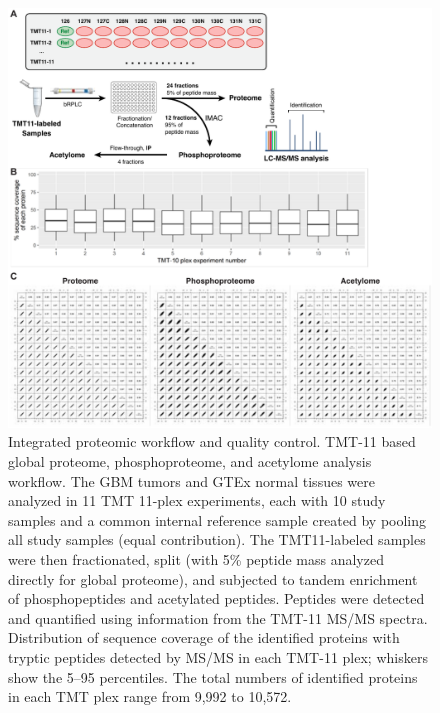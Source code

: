 \begin{figure}[p]
    \centering
    \includegraphics[width=0.9\linewidth]{figures/chap04_cptac_gbm_discov/figures1_proteome_qc.pdf}
    \caption[Integrated proteomic workflow and quality control.]{%
        Integrated proteomic workflow and quality control.
        TMT-11 based global proteome, phosphoproteome, and acetylome analysis workflow. The GBM tumors and GTEx normal tissues were analyzed in 11 TMT 11-plex experiments, each with 10 study samples and a common internal reference sample created by pooling all study samples (equal contribution). The TMT11-labeled samples were then fractionated, split (with 5\% peptide mass analyzed directly for global proteome), and subjected to tandem enrichment of phosphopeptides and acetylated peptides. Peptides were detected and quantified using information from the TMT-11 MS/MS spectra.
        Distribution of sequence coverage of the identified proteins with tryptic peptides detected by MS/MS in each TMT-11 plex; whiskers show the 5--95 percentiles. The total numbers of identified proteins in each TMT plex range from 9,992 to 10,572.
        \legendcontdnote
    }
    \label{fig:gbm-proteomic-qc}
\end{figure}
\begin{figure}[t]
    \centering
\end{figure}

